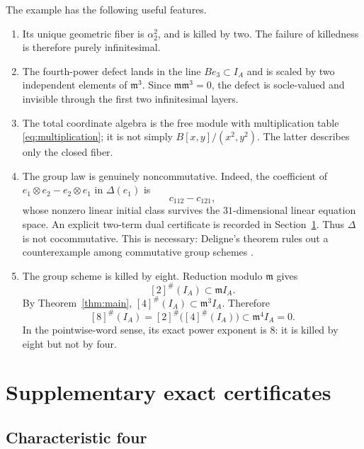\documentclass[11pt]{article}
\theoremstyle{remark}
\newcommand{\m}{\mathfrak m}
\begin{document}
The example has the following useful features.
\begin{enumerate}
\item Its unique geometric fiber is \(\alpha_2^2\), and is killed by two.
The failure of killedness is therefore purely infinitesimal.

\item The fourth-power defect lands in the line \(Be_3\subset I_A\) and is
scaled by two independent elements of \(\m^3\).  Since \(\m\m^3=0\), the
defect is socle-valued and invisible through the first two infinitesimal
layers.

\item The total coordinate algebra is the free module with multiplication
table \eqref{eq:multiplication}; it is not simply
\(B[x,y]/(x^2,y^2)\).  The latter describes only the closed fiber.

\item The group law is genuinely noncommutative.  Indeed, the coefficient of
\(e_1\otimes e_2-e_2\otimes e_1\) in \(\Delta(e_1)\) is
\[
  c_{112}-c_{121},
\]
whose nonzero linear initial class survives the \(31\)-dimensional linear
equation space.  An explicit two-term dual certificate is recorded in
Section~\ref{sec:extra-certificates}.  Thus \(\Delta\) is not cocommutative.
This is necessary: Deligne's theorem rules out a counterexample among
commutative group schemes \cite{SchoofSurvey}.

\item The group scheme is killed by eight.  Reduction modulo \(\m\) gives
\[
  [2]^\#(I_A)\subset\m I_A.
\]
By Theorem~\ref{thm:main},
\([4]^\#(I_A)\subset\m^3I_A\).  Therefore
\[
 [8]^\#(I_A)
 =[2]^\#\bigl([4]^\#(I_A)\bigr)
 \subset\m^4I_A=0.
\]
In the pointwise-word sense, its exact power exponent is \(8\): it is killed
by eight but not by four.
\end{enumerate}

\section{Supplementary exact certificates}\label{sec:extra-certificates}

\subsection{Characteristic four}
\end{document}

